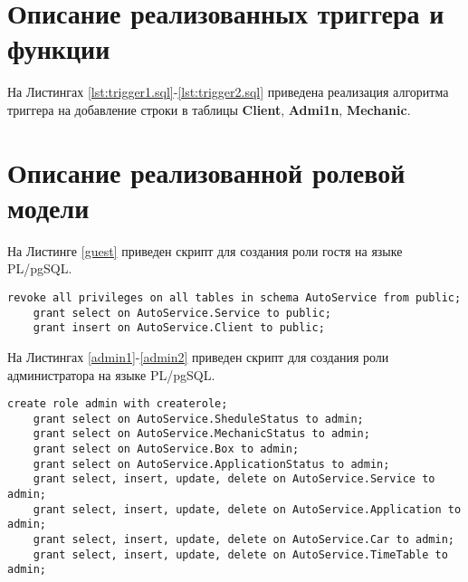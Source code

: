 \section{Описание реализованных триггера и функции}

На Листингах \ref{lst:trigger1.sql}-\ref{lst:trigger2.sql}  приведена реализация алгоритма триггера на добавление строки в таблицы \textbf{Client}, \textbf{Admi1n}, \textbf{Mechanic}.

\newpage


\newpage


\section{Описание реализованной ролевой модели}

На Листинге \ref{guest} приведен скрипт для создания роли гостя на языке PL/pgSQL.

\begin{lstlisting}[label=guest, style=mystyle, caption=Скрипт для создания роли гостя на языке PL/pgSQL]
	revoke all privileges on all tables in schema AutoService from public;
	grant select on AutoService.Service to public;
	grant insert on AutoService.Client to public;
\end{lstlisting}

На Листингах \ref{admin1}-\ref{admin2} приведен скрипт для создания роли администратора на языке PL/pgSQL.

\begin{lstlisting}[label=admin1, style=mystyle, caption=Скрипт для создания роли администратора на языке PL/pgSQL(ч. 1)]
	create role admin with createrole;
	grant select on AutoService.SheduleStatus to admin;
	grant select on AutoService.MechanicStatus to admin;
	grant select on AutoService.Box to admin;
	grant select on AutoService.ApplicationStatus to admin;
	grant select, insert, update, delete on AutoService.Service to admin;
	grant select, insert, update, delete on AutoService.Application to admin;
	grant select, insert, update, delete on AutoService.Car to admin;
	grant select, insert, update, delete on AutoService.TimeTable to admin;
\end{lstlisting}

